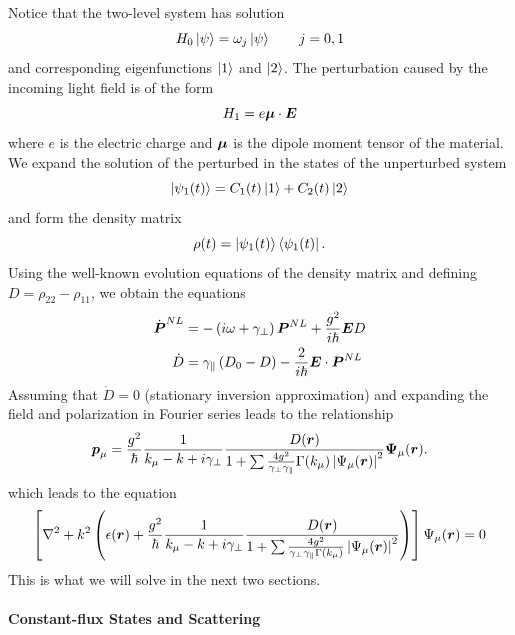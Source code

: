 Notice that the two-level system has solution
  \begin{equation}
   H_0\Ket{\psi}=\omega_j\Ket{\psi}	\qquad j=0,1
  \end{equation}
and corresponding eigenfunctions $\Ket{1}$ and $\Ket{2}$. 
The perturbation caused by the incoming light field is of the
form 
  \begin{equation}
   H_1 = e\boldsymbol{\mu}\cdot\boldsymbol{E}
  \end{equation}
where $e$ is the electric charge and $\boldsymbol{\mu}$ is the 
dipole moment tensor of the material.  We expand the solution 
of the perturbed in the states of the unperturbed system
  \begin{equation}
   \Ket{\psi_1(t)}=C_1(t)\Ket{1}+C_2(t)\Ket{2}
  \end{equation}
and form the density matrix
  \begin{equation}
   \rho(t) = \Ket{\psi_1(t)}\Bra{\psi_1(t)}.
  \end{equation}
Using the well-known evolution equations of the density
matrix \cite[\S6.2]{BOY2008} and defining
$D=\rho_{22}-\rho_{11}$, we obtain the equations
\cite[\S5.3]{HAK1985b}
  \begin{align}
   \dot{\boldsymbol{P}}^{NL}	&= -\left(i\omega+\gamma_\perp\right)\boldsymbol{P}^{NL}+\frac{g^2}{i\hbar}\boldsymbol{E}D	\\
   \dot{D}		&= \gamma_\parallel\left(D_0-D\right)-\frac{2}{i\hbar}\boldsymbol{E}\cdot\boldsymbol{P}^{NL}
  \end{align}
Assuming that $\dot{D}=0$ (stationary inversion approximation) 
and expanding the field and polarization in Fourier series
leads to the relationship
  \begin{equation}
   \boldsymbol{p}_\mu = \frac{g^2}{\hbar}\frac{1}{k_\mu-k+i\gamma_\perp}\frac{D(\boldsymbol{r})}{1+\sum\frac{4g^2}{\gamma_\perp\gamma_\parallel}\Gamma(k_\mu)\left|\Psi_\mu(\boldsymbol{r})\right|^2}\boldsymbol{\Psi}_\mu(\boldsymbol{r}).
  \end{equation}
which leads to the equation
  \begin{equation}
   \left[\nabla^2+k^2\left(\epsilon(\boldsymbol{r})+\frac{g^2}{\hbar}\frac{1}{k_\mu-k+i\gamma_\perp}\frac{D(\boldsymbol{r})}{1+\sum\frac{4g^2}{\gamma_\perp\gamma_\parallel\Gamma(k_\mu)}\left|\Psi_\mu(\boldsymbol{r})\right|^2}\right)\right]\Psi_\mu(\boldsymbol{r})=0
  \end{equation}
This is what we will solve in the next two sections.

\paragraph{Constant-flux States and Scattering}    

